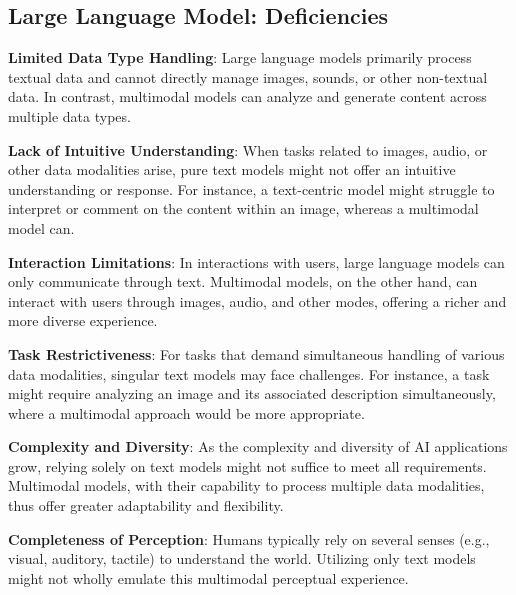 \documentclass[11pt]{article}
\begin{document}
\subsection{Large Language Model: Deficiencies}
\begin{enumerate}

\noindent \textbf{Limited Data Type Handling}: Large language models primarily process textual data and cannot directly manage images, sounds, or other non-textual data. In contrast, multimodal models can analyze and generate content across multiple data types.



\noindent \textbf{Lack of Intuitive Understanding}: When tasks related to images, audio, or other data modalities arise, pure text models might not offer an intuitive understanding or response. For instance, a text-centric model might struggle to interpret or comment on the content within an image, whereas a multimodal model can.



\noindent \textbf{Interaction Limitations}: In interactions with users, large language models can only communicate through text. Multimodal models, on the other hand, can interact with users through images, audio, and other modes, offering a richer and more diverse experience.



\noindent \textbf{Task Restrictiveness}: For tasks that demand simultaneous handling of various data modalities, singular text models may face challenges. For instance, a task might require analyzing an image and its associated description simultaneously, where a multimodal approach would be more appropriate.



\noindent \textbf{Complexity and Diversity}: As the complexity and diversity of AI applications grow, relying solely on text models might not suffice to meet all requirements. Multimodal models, with their capability to process multiple data modalities, thus offer greater adaptability and flexibility.



\noindent \textbf{Completeness of Perception}: Humans typically rely on several senses (e.g., visual, auditory, tactile) to understand the world. Utilizing only text models might not wholly emulate this multimodal perceptual experience.\cite{enwiki:1181088602}

\end{enumerate}
\end{document}
